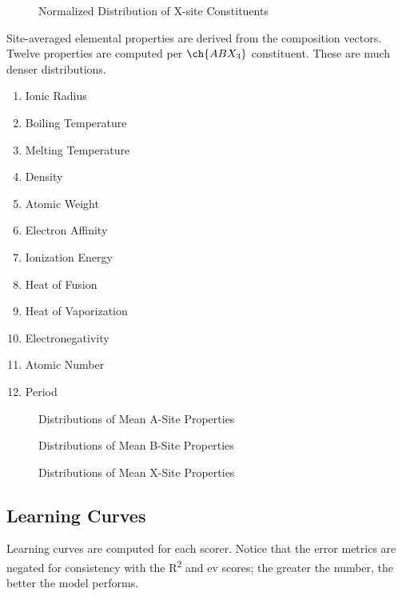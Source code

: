 \documentclass[aip, jmp, amsmath, amssymb, nofootinbib]{revtex4-2}
\begin{document}
 
\begin{figure}[htbp]
\centering

\caption{Normalized Distribution of X-site Constituents}
\end{figure}

Site-averaged elemental properties are derived from the composition
vectors. Twelve properties are computed per \(\ch{ABX_3}\)
constituent. These are much denser distributions.
\begin{enumerate}
\item Ionic Radius
\item Boiling Temperature
\item Melting Temperature
\item Density
\item Atomic Weight
\item Electron Affinity
\item Ionization Energy
\item Heat of Fusion
\item Heat of Vaporization
\item Electronegativity
\item Atomic Number
\item Period
\end{enumerate}

 
\begin{figure}[htbp]
\centering

\caption{Distributions of Mean A-Site Properties}
\end{figure}

 
\begin{figure}[htbp]
\centering

\caption{Distributions of Mean B-Site Properties}
\end{figure}

 
\begin{figure}[htbp]
\centering

\caption{Distributions of Mean X-Site Properties}
\end{figure}

\subsection*{Learning Curves}
\label{sec:orgfb4edce}
Learning curves are computed for each scorer. Notice that the error
metrics are negated for consistency with the R\textsuperscript{2} and ev scores; the
greater the number, the better the model performs.
\end{document}
